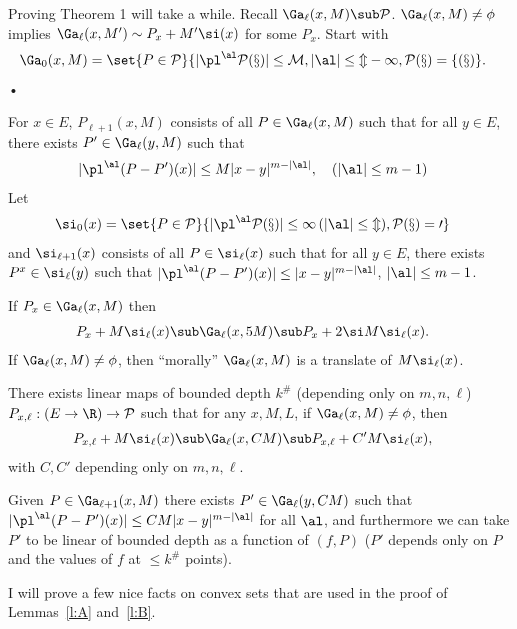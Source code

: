 Proving Theorem 1 will take a while.
Recall $\Ga_\ell(x,M)\sub \cal P$. $\Ga_\ell(x,M)\ne \phi$ implies $\Ga_\ell(x,M')\sim P_x+M'\si(x)$ for some $P_x$.  Start with 
\begin{align}
\Ga_0(x,M) &= \set{P\in \cal P}{|\pl^\al P(x)|\le M, |\al|\le m-1, P(x)=f(x)}.
\end{align}•

For $x\in E$, $P_{\ell+1}(x,M)$ consists of all $P\in \Ga_\ell(x,M)$ such that  for all $y\in E$, there exists $P'\in \Ga_\ell(y,M)$ such that 
\begin{align}
|\pl^\al(P-P')(x)|&\le M|x-y|^{m-|\al|}, \quad (|\al|\le m-1)
\end{align}
Let
\begin{align}
\si_0(x) &= \set{P\in \cal P}{|\pl^\al P(x)|\le 1\, (|\al|\le m), P(x)=0}
\end{align}
and $\si_{\ell+1}(x)$ consists of all $P\in \si_\ell(x)$ such that for all $y\in E$, there exists $P^x\in \si_\ell(y)$ such that $|\pl^\al(P-P')(x)|\le |x-y|^{m-|\al|}$, $|\al|\le m-1$. 

If $P_x\in \Ga_\ell(x,M)$ then 
\begin{align}P_x+M\si_\ell(x)&\sub \Ga_\ell(x,5M) \sub P_x + 2\si M\si_\ell(x).
\end{align}
If $\Ga_\ell(x,M)\ne\phi$, then ``morally'' $\Ga_\ell(x,M)$ is a translate of $M\si_\ell(x)$. 
\begin{lem}\label{l:A}
There exists linear maps of bounded depth $k^\#$ (depending only on $m,n,\ell$)
$P_{x,\ell}: (E\to \R) \to \cal P$ such that for any $x,M, L$, if $\Ga_\ell(x,M) \ne \phi$, then
\begin{align}
P_{x,\ell} + M\si_{\ell}(x)  &\sub \Ga_\ell(x,CM) \sub P_{x,\ell} + C'M \si_\ell(x),
\end{align}
with $C,C'$ depending only on $m,n,\ell$.
\end{lem}
\begin{lem}\label{l:B}
Given $P\in \Ga_{\ell+1}(x,M)$ there exists $P'\in \Ga_\ell(y,CM)$ such that $|\pl^\al(P-P')(x)|\le CM|x-y|^{m-|\al|}$  for all $\al$, and furthermore we can take $P'$ to be  linear of bounded depth  as a function of $(f,P)$ ($P'$ depends only on $P$ and the values of $f$ at $\le k^\#$ points). 
\end{lem}
I will prove a few nice facts on convex sets that are used in the proof of Lemmas~\ref{l:A} and~\ref{l:B}.

